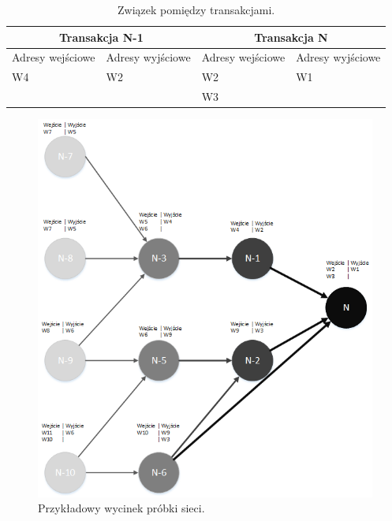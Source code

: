 \documentclass[12pt, twoside, final, openany]{mgr}
\begin{document}
\begin{table}[H]
\begin{center}
\caption{Związek pomiędzy transakcjami.}
\label{tab:zwiazekTransakcji}
\begin{tabular}{|l|l|l|l|}
\hline
	\multicolumn{2}{|c|}{Transakcja N-1} 
   &\multicolumn{2}{|c|}{Transakcja N}  \\
\hline
Adresy wejściowe & Adresy wyjściowe &Adresy wejściowe & Adresy wyjściowe\\
\hline
W4 & W2 & W2 & W1 \\
&& W3 & \\
\hline 
\end{tabular}
\end{center}
\end{table}

\begin{figure}[H]
\begin{center}
\centering
\includegraphics[width=1\linewidth]{pictures/visio/siec.png}
\caption{Przykładowy wycinek próbki sieci.}
\label{fig:siec}
\end{center}
\end{figure}
\end{document}
